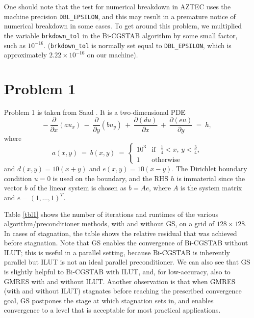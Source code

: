 \documentclass[12pt,a4paper]{article}
\newcounter{i}
\def\time{\!\times\!}
\begin{document}
One should note that the test for numerical breakdown in AZTEC uses 
the machine precision {\tt DBL\_EPSILON}, and this may result in a
premature notice of numerical breakdown in some cases.  To get around 
this problem, we multiplied the variable {\tt brkdown\_tol} in the 
Bi-CGSTAB algorithm by some small factor, such as $10^{-16}$.
({\tt brkdown\_tol} is normally set equal to {\tt DBL\_EPSILON}, 
which is approximately $2.22\time 10^{-16}$ on our machine).  




\section{Problem 1}
\label{prob1}

Problem 1 is taken from Saad \cite[\S 3.7, problem F2DB]{Saad03}.  
It is a two-dimensional PDE
\[ -~ \frac{\partial}{\partial x}(a u_x)
   ~-~ \frac{\partial}{\partial y}(b u_y)
   ~+~ \frac{\partial(du)}{\partial x}
   ~+~ \frac{\partial(eu)}{\partial y}
   ~=~ h,
\]
where 
\[
a(x,y)~=~b(x,y) ~=~ 
\left\{\begin{array}{ll}
	10^3 & \mbox{if~~} \frac{1}{4} < x,~y < \frac{3}{4},\\[5pt]
	1 & \mbox{otherwise}
       \end{array} \right.
\]
and $d(x,y) = 10(x+y)$ and $e(x,y) = 10(x-y)$.  The Dirichlet boundary 
condition $u=0$ is used on the boundary, and the RHS $h$ is immaterial 
since the vector $b$ of the linear system is chosen as $b=Ae$, where 
$A$ is the system matrix and $e=(1,\ldots,1)^T$. 

Table \ref{tbl1} shows the number of iterations and runtimes of the 
various algorithm/preconditioner methods, with and without GS, on a grid 
of $128\time 128$.  In cases of stagnation, the table shows the relative
residual that was achieved before stagnation.  Note that GS enables the 
convergence of Bi-CGSTAB without ILUT; this is useful in a parallel 
setting, because Bi-CGSTAB is inherently parallel but ILUT is not an 
ideal parallel preconditioner.  We can also see that GS is slightly 
helpful to Bi-CGSTAB with ILUT, and, for low-accuracy, also to GMRES 
with and without ILUT.  Another observation is that when GMRES (with 
and without ILUT) stagnates before reaching the prescribed convergence 
goal, GS postpones the stage at which stagnation sets in, and enables 
convergence to a level that is acceptable for most practical 
applications.
\end{document}
